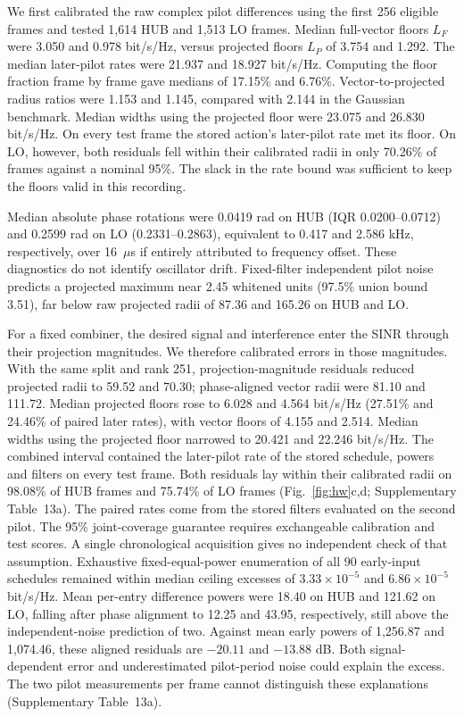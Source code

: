 \documentclass[11pt,letterpaper]{article}
\begin{document}
We first calibrated the raw complex pilot differences using the first 256 eligible frames and tested 1,614 HUB and 1,513 LO frames. Median full-vector floors \(L_F\) were 3.050 and 0.978 bit/s/Hz, versus projected floors \(L_P\) of 3.754 and 1.292. The median later-pilot rates were 21.937 and 18.927 bit/s/Hz. Computing the floor fraction frame by frame gave medians of 17.15\% and 6.76\%. Vector-to-projected radius ratios were 1.153 and 1.145, compared with 2.144 in the Gaussian benchmark. Median widths using the projected floor were 23.075 and 26.830 bit/s/Hz. On every test frame the stored action's later-pilot rate met its floor. On LO, however, both residuals fell within their calibrated radii in only 70.26\% of frames against a nominal 95\%. The slack in the rate bound was sufficient to keep the floors valid in this recording.


Median absolute phase rotations were 0.0419 rad on HUB (IQR 0.0200--0.0712) and 0.2599 rad on LO (0.2331--0.2863), equivalent to 0.417 and 2.586 kHz, respectively, over 16~\(\mu\)s if entirely attributed to frequency offset. These diagnostics do not identify oscillator drift. Fixed-filter independent pilot noise predicts a projected maximum near 2.45 whitened units (97.5\% union bound 3.51), far below raw projected radii of 87.36 and 165.26 on HUB and LO.

For a fixed combiner, the desired signal and interference enter the SINR through their projection magnitudes. We therefore calibrated errors in those magnitudes. With the same split and rank 251, projection-magnitude residuals reduced projected radii to 59.52 and 70.30; phase-aligned vector radii were 81.10 and 111.72. Median projected floors rose to 6.028 and 4.564 bit/s/Hz (27.51\% and 24.46\% of paired later rates), with vector floors of 4.155 and 2.514. Median widths using the projected floor narrowed to 20.421 and 22.246 bit/s/Hz. The combined interval contained the later-pilot rate of the stored schedule, powers and filters on every test frame. Both residuals lay within their calibrated radii on 98.08\% of HUB frames and 75.74\% of LO frames (Fig.~\ref{fig:hw}c,d; Supplementary Table~13a). The paired rates come from the stored filters evaluated on the second pilot. The 95\% joint-coverage guarantee requires exchangeable calibration and test scores. A single chronological acquisition gives no independent check of that assumption. Exhaustive fixed-equal-power enumeration of all 90 early-input schedules remained within median ceiling excesses of \(3.33\times10^{-5}\) and \(6.86\times10^{-5}\) bit/s/Hz. Mean per-entry difference powers were 18.40 on HUB and 121.62 on LO, falling after phase alignment to 12.25 and 43.95, respectively, still above the independent-noise prediction of two. Against mean early powers of 1,256.87 and 1,074.46, these aligned residuals are \(-20.11\) and \(-13.88\) dB. Both signal-dependent error and underestimated pilot-period noise could explain the excess. The two pilot measurements per frame cannot distinguish these explanations (Supplementary Table~13a).
\end{document}
